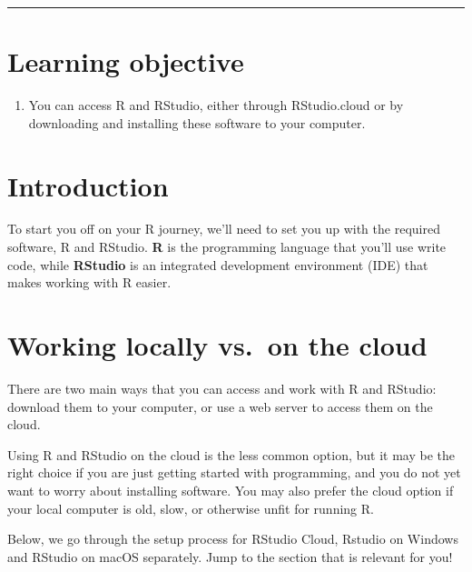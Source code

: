 \documentclass[
  letterpaper,
  DIV=11,
  numbers=noendperiod]{scrreprt}
\providecommand{\tightlist}{%
  \setlength{\itemsep}{0pt}\setlength{\parskip}{0pt}}\usepackage{longtable,booktabs,array}
\begin{document}
\begin{center}\rule{0.5\linewidth}{0.5pt}\end{center}

\hypertarget{learning-objective-1}{%
\section*{Learning objective}\label{learning-objective-1}}


\begin{enumerate}
\def\labelenumi{\arabic{enumi}.}
\tightlist
\item
  You can access R and RStudio, either through RStudio.cloud or by
  downloading and installing these software to your computer.
\end{enumerate}

\hypertarget{introduction-2}{%
\section{Introduction}\label{introduction-2}}

To start you off on your R journey, we'll need to set you up with the
required software, R and RStudio. \textbf{R} is the programming language
that you'll use write code, while \textbf{RStudio} is an integrated
development environment (IDE) that makes working with R easier.

\hypertarget{working-locally-vs.-on-the-cloud-1}{%
\section{Working locally vs.~on the
cloud}\label{working-locally-vs.-on-the-cloud-1}}

There are two main ways that you can access and work with R and RStudio:
download them to your computer, or use a web server to access them on
the cloud.

Using R and RStudio on the cloud is the less common option, but it may
be the right choice if you are just getting started with programming,
and you do not yet want to worry about installing software. You may also
prefer the cloud option if your local computer is old, slow, or
otherwise unfit for running R.

Below, we go through the setup process for RStudio Cloud, Rstudio on
Windows and RStudio on macOS separately. Jump to the section that is
relevant for you!
\end{document}

